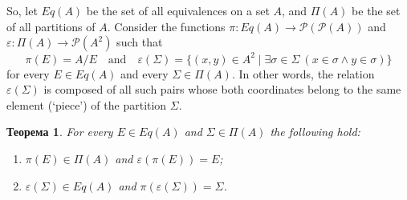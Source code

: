\documentclass[12pt,notitlepage]{article}
\theoremstyle{plain}
\newtheorem{thm}{Теорема}[section]
\theoremstyle{definition}
\theoremstyle{plain}
\newcommand{\sbs}{\subseteq}
\newcommand{\void}{\varnothing}
\newcommand{\mP}{\mathcal{P}}
\newcommand{\eps}{\varepsilon}
\newcommand{\1}{\mathbf{1}}
\newcommand{\0}{\mathbf{0}}
\begin{document}
So, let $Eq(A)$ be the set of all equivalences on a set $A$, and $\Pi(A)$ be the set of all partitions of $A$. Consider the functions $\pi\colon Eq(A) \to \mP (\mP(A))$ and $\eps\colon \Pi(A) \to \mP(A^2)$ such that
$$\pi(E) = A / E \quad\mbox{and}\quad \eps(\Sigma) = \{(x,y) \in A^2 \mid \exists \sigma \in \Sigma\: (x \in \sigma \wedge y \in \sigma)\}$$
for every $E \in Eq(A)$ and every $\Sigma \in \Pi(A)$. In other words, the relation $\eps(\Sigma)$ is composed of all such pairs whose both coordinates belong to the same element (`piece') of the partition $\Sigma$.
\begin{thm}
	For every $E \in Eq(A)$ and $\Sigma \in \Pi(A)$ the following hold:
	\begin{enumerate}
		\item $\pi(E) \in \Pi(A)$ and $\eps(\pi(E)) = E$;
		\item $\eps(\Sigma) \in Eq(A)$ and $\pi(\eps(\Sigma)) = \Sigma$.
	\end{enumerate}
\end{thm}
%
%
%
%
\end{document}
